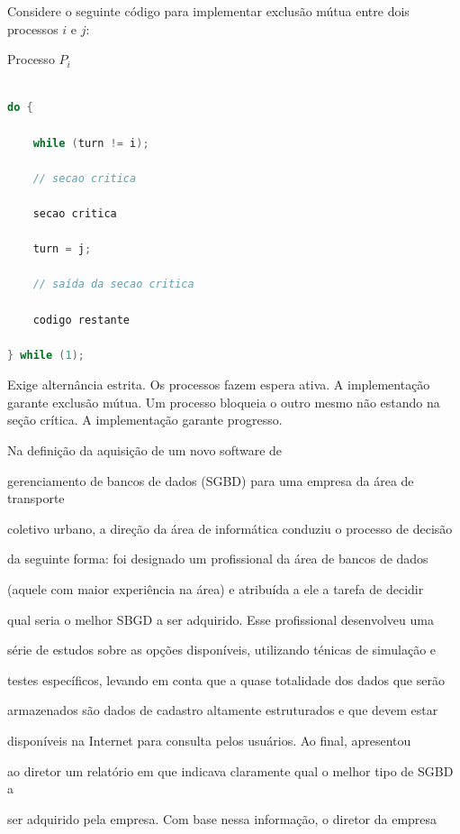 \documentclass[12pt, addpoints]{exam}
\begin{document}
\begin{questions}
Considere o seguinte código para implementar exclusão mútua entre dois processos \(i\) e \(j\): 

Processo \(P_i\)

\begin{lstlisting}[language=C, basicstyle=\ttfamily\small]

do {

    while (turn != i); 

    // secao critica

    secao critica

    turn = j;

    // saída da secao critica

    codigo restante

} while (1);

\end{lstlisting} 
\begin{choices}
\choice Exige alternância estrita. 
\choice Os processos fazem espera ativa.
\choice A implementação garante exclusão mútua.
\choice Um processo bloqueia o outro mesmo não estando na seção crítica.
\choice A implementação garante progresso. 
\end{choices}

\question

Na definição da aquisição de um novo software de

gerenciamento de bancos de dados (SGBD) para uma empresa da área de transporte 

coletivo urbano, a direção da área de informática conduziu o processo de decisão

da seguinte forma: foi designado um profissional da área de bancos de dados

(aquele com maior experiência na área) e atribuída a ele a tarefa de decidir

qual seria o melhor SBGD a ser adquirido. Esse profissional desenvolveu uma

série de estudos sobre as opções disponíveis, utilizando ténicas de simulação e

testes específicos, levando em conta que a quase totalidade dos dados que serão

armazenados são dados de cadastro altamente estruturados e que devem estar

disponíveis na Internet para consulta pelos usuários. Ao final, apresentou

ao diretor um relatório em que indicava claramente qual o melhor tipo de SGBD a

ser adquirido pela empresa. Com base nessa informação, o diretor da empresa


\end{questions}
\end{document}
